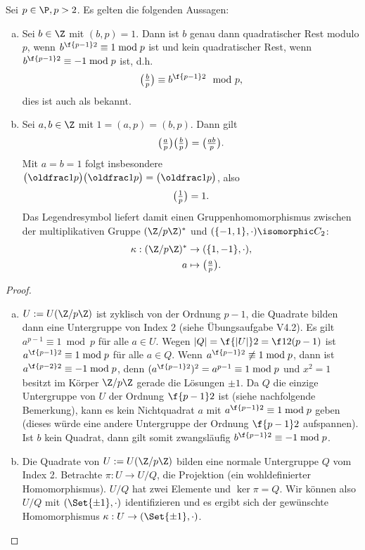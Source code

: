 \begin{lem} \label{2.14}
	Sei $p \in \P, p > 2$.
	Es gelten die folgenden Aussagen:
	\begin{enumerate}[a)]
		\item
			Sei $b \in \Z$ mit $(b, p) = 1$.
			Dann ist $b$ genau dann quadratischer Rest modulo $p$, wenn $b^{\f {p-1}2} \equiv 1 \bmod p$
			ist und kein quadratischer Rest, wenn $b^{\f {p-1}2} \equiv -1 \bmod p$	ist, d.h.
			\[
				\legsym bp \equiv b^{\f {p-1}2} \mod p,
			\]
			dies ist auch als  bekannt.
		\item
			Sei $a, b \in \Z$ mit $1 = (a,p) = (b, p)$.
			Dann gilt
			\[
				\legsym ap \legsym bp = \legsym {ab}p.
			\]
			Mit $a = b = 1$ folgt insbesondere $\legsym 1p \legsym 1p = \legsym 1p$, also
			\[
				\legsym 1p = 1.
			\]
			Das Legendresymbol liefert damit einen Gruppenhomomorphismus zwischen der multiplikativen Gruppe $(\Z / p\Z)^*$ und $(\{-1,1\}, \cdot) \isomorphic C_2$:
			\begin{align*}
				\kappa: (\Z / p\Z)^* &\to (\{1,-1\}, \cdot), \\
				a &\mapsto \legsym ap.
			\end{align*}
	\end{enumerate}
	\begin{proof}
		\begin{enumerate}[a)]
			\item
				$U := U(\Z / p\Z)$ ist zyklisch von der Ordnung $p - 1$, die Quadrate bilden dann eine Untergruppe von Index 2 (siehe Übungsaufgabe V4.2).
				Es gilt $a^{p-1} \equiv 1 \bmod p$ für alle $a \in U$.
				Wegen $|Q| = \f {|U|}2 = \f 12 (p-1)$ ist $a^{\f {p-1}2} \equiv 1 \bmod p$ für alle $a \in Q$.
				Wenn $a^{\f{p-1}2} \not\equiv 1 \bmod p$, dann ist $a^{\f{p-2}2} \equiv -1 \bmod p$, denn $(a^{\f{p-1}2})^2 = a^{p-1} \equiv 1 \bmod p$ und $x^2 = 1$ besitzt im Körper $\Z / p \Z$ gerade die Lösungen $\pm 1$.
				Da $Q$ die einzige Untergruppe von $U$ der Ordnung $\f{p-1}2$ ist (siehe nachfolgende Bemerkung), kann es kein Nichtquadrat $a$ mit $a^{\f{p-1}2} \equiv 1 \bmod p$ geben (dieses würde eine andere Untergruppe der Ordnung $\f {p-1}2$ aufspannen).
				Ist $b$ kein Quadrat, dann gilt somit zwangsläufig $b^{\f{p-1}2} \equiv -1 \bmod p$.
			\item
				Die Quadrate von $U := U(\Z / p \Z)$ bilden eine normale Untergruppe $Q$ vom Index 2.
				Betrachte $\pi: U \to U / Q$, die Projektion (ein wohldefinierter Homomorphismus).
				$U / Q$ hat zwei Elemente und $\ker \pi = Q$.
				Wir können also $U / Q$ mit $(\Set{\pm 1}, \cdot)$ identifizieren und es ergibt sich der gewünschte Homomorphismus $\kappa: U \to (\Set{\pm 1}, \cdot)$.
		\end{enumerate}
	\end{proof}
\end{lem}

